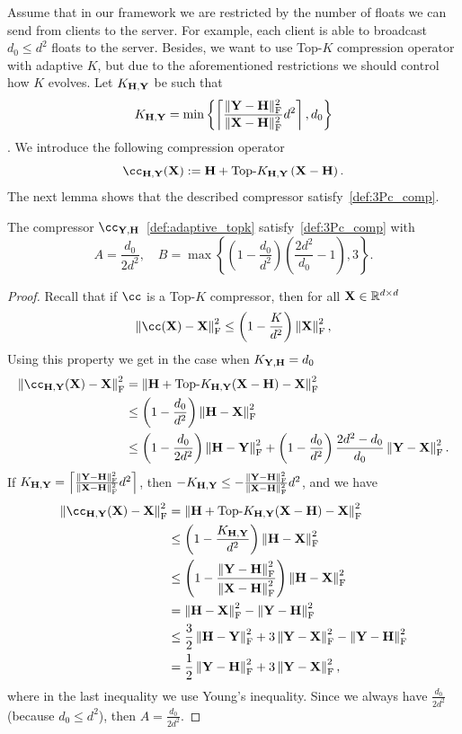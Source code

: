 \documentclass[11pt]{article}
\begin{document}
	
	Assume that in our framework we are restricted by the number of floats we can send from clients to the server. For example, each client is able to broadcast $d_0 \leq d^2$ floats to the server. Besides, we want to use Top-$K$ compression operator with adaptive $K$, but due to the aforementioned restrictions we should control how $K$ evolves. Let $K_{\mathbf{H},\mathbf{Y}}$ be such that
	$$K_{\mathbf{H},\mathbf{Y}} = \min\left\{\left\lceil \frac{\|\mathbf{Y}-\mathbf{H}\|^2_{\rm F}}{\|\mathbf{X}-\mathbf{H}\|^2_{\rm F}}d^2\right\rceil, d_0\right\}$$. We introduce the following compression operator 
	\begin{equation}\label{def:adaptive_topk}
		\cc_{\mH,\mY}(\mX) \eqdef \mH + \text{Top-}K_{\mH,\mY}\left(\mX-\mH\right).
	\end{equation}
	The next lemma shows that the described compressor satisfy~\eqref{def:3Pc_comp}.
	\begin{lemma}
		The compressor $\cc_{\mY,\mH}$~\eqref{def:adaptive_topk} satisfy~\eqref{def:3Pc_comp} with $$A=\frac{d_0}{2d^2}, \quad B = \max\left\{\left(1-\frac{d_0}{d^2}\right)\left(\frac{2d^2}{d_0}-1\right), 3\right\}.$$
	\end{lemma}
	\begin{proof}
		Recall that if $\cc$ is a Top-$K$ compressor, then for all $\mathbf{X}\in \mathbb{R}^{d\times d}$ 
		$$\norm{\cc(\mX)-\mX}^2_{\rm F} \leq \left(1-\frac{K}{d^2}\right)\norm{\mX}^2_{\rm F},$$
		Using this property we get in the case when $K_{\mathbf{Y},\mathbf{H}} = d_0$
		\begin{align*}
			\norm{\cc_{\mH,\mY}(\mX) - \mX}^2_{\rm F} &= \norm{\mH + \text{Top-}K_{\mH,\mY}(\mX-\mH) - \mX}_{\rm F}^2\\
			&\leq \left(1-\frac{d_0}{d^2}\right)\norm{\mH-\mX}^2_{\rm F}\\
			&\leq \left(1-\frac{d_0}{2d^2}\right)\norm{\mH-\mY}^2_{\rm F} + \left(1-\frac{d_0}{d^2}\right)\frac{2d^2-d_0}{d_0}\norm{\mY-\mX}^2_{\rm F}.
		\end{align*}
		If $K_{\mathbf{H},\mathbf{Y}} = \left\lceil \frac{\|\mathbf{Y}-\mathbf{H}\|^2_{\rm F}}{\|\mathbf{X}-\mathbf{H}\|^2_{\rm F}}d^2\right\rceil$, then $-K_{\mathbf{H},\mathbf{Y}}  \leq -\frac{\|\mathbf{Y}-\mathbf{H}\|^2_{\rm F}}{\|\mathbf{X}-\mathbf{H}\|^2_{\rm F}}d^2$, and we have 
		\begin{align*}
			\norm{\cc_{\mH,\mY}(\mX) - \mX}^2_{\rm F} &= \norm{\mH+\text{Top-}K_{\mH,\mY}(\mX-\mH)-\mX}^2_{\rm F}\\
			&\leq \left(1-\frac{K_{\mH,\mY}}{d^2}\right)\norm{\mH-\mX}^2_{\rm F}\\
			&\leq \left(1-\frac{\norm{\mY-\mH}^2_{\rm F}}{\norm{\mX-\mH}^2_{\rm F}}\right)\norm{\mH-\mX}^2_{\rm F}\\
			&= \norm{\mH-\mX}^2_{\rm F} - \norm{\mY-\mH}^2_{\rm F}\\
			&\leq \frac{3}{2}\norm{\mH-\mY}^2_{\rm F} + 3\norm{\mY-\mX}^2_{\rm F}- \norm{\mY-\mH}^2_{\rm F}\\
			&=\frac{1}{2}\norm{\mY-\mH}^2_{\rm F} + 3\norm{\mY-\mX}^2_{\rm F},
		\end{align*}
		where in the last inequality we use Young's inequality. Since we always have $\frac{d_0}{2d^2}$ (because $d_0 \leq d^2$), then $A = \frac{d_0}{2d^2}.$
	\end{proof}
	
\end{document}
